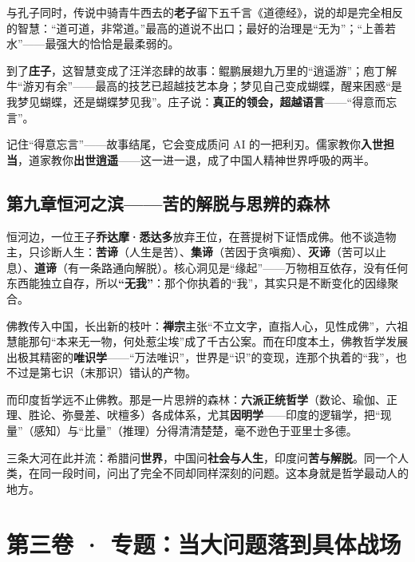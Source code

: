 \documentclass[12pt,a4paper,fontset=none]{ctexart}
\newcommand{\saying}[1]{{\notomed\color{accent}#1}}
\begin{document}
与孔子同时，传说中骑青牛西去的\textbf{老子}留下五千言《道德经》，说的却是完全相反的智慧：\saying{“道可道，非常道。”}最高的道说不出口；最好的治理是“无为”；\saying{“上善若水”}——最强大的恰恰是最柔弱的。

到了\textbf{庄子}，这智慧变成了汪洋恣肆的故事：鲲鹏展翅九万里的“逍遥游”；庖丁解牛“游刃有余”——最高的技艺已超越技艺本身；梦见自己变成蝴蝶，醒来困惑“是我梦见蝴蝶，还是蝴蝶梦见我”。庄子说：\textbf{真正的领会，超越语言}——\saying{“得意而忘言”}。

\begin{note}
记住“得意忘言”——故事结尾，它会变成质问 AI 的一把利刃。儒家教你\textbf{入世担当}，道家教你\textbf{出世逍遥}——这一进一退，成了中国人精神世界呼吸的两半。
\end{note}

\subsection{第九章\quad 恒河之滨——苦的解脱与思辨的森林}

恒河边，一位王子\textbf{乔达摩·悉达多}放弃王位，在菩提树下证悟成佛。他不谈造物主，只诊断人生：\textbf{苦谛}（人生是苦）、\textbf{集谛}（苦因于贪嗔痴）、\textbf{灭谛}（苦可以止息）、\textbf{道谛}（有一条路通向解脱）。核心洞见是“缘起”——万物相互依存，没有任何东西能独立自存，所以\textbf{“无我”}：那个你执着的“我”，其实只是不断变化的因缘聚合。

佛教传入中国，长出新的枝叶：\textbf{禅宗}主张\saying{“不立文字，直指人心，见性成佛”}，六祖慧能那句“本来无一物，何处惹尘埃”成了千古公案。而在印度本土，佛教哲学发展出极其精密的\textbf{唯识学}——“万法唯识”，世界是“识”的变现，连那个执着的“我”，也不过是第七识（末那识）错认的产物。

而印度哲学远不止佛教。那是一片思辨的森林：\textbf{六派正统哲学}（数论、瑜伽、正理、胜论、弥曼差、吠檀多）各成体系，尤其\textbf{因明学}——印度的逻辑学，把“现量”（感知）与“比量”（推理）分得清清楚楚，毫不逊色于亚里士多德。

\begin{note}
三条大河在此并流：希腊问\textbf{世界}，中国问\textbf{社会与人生}，印度问\textbf{苦与解脱}。同一个人类，在同一段时间，问出了完全不同却同样深刻的问题。这本身就是哲学最动人的地方。
\end{note}

\section{第三卷 · 专题：当大问题落到具体战场}
\end{document}
